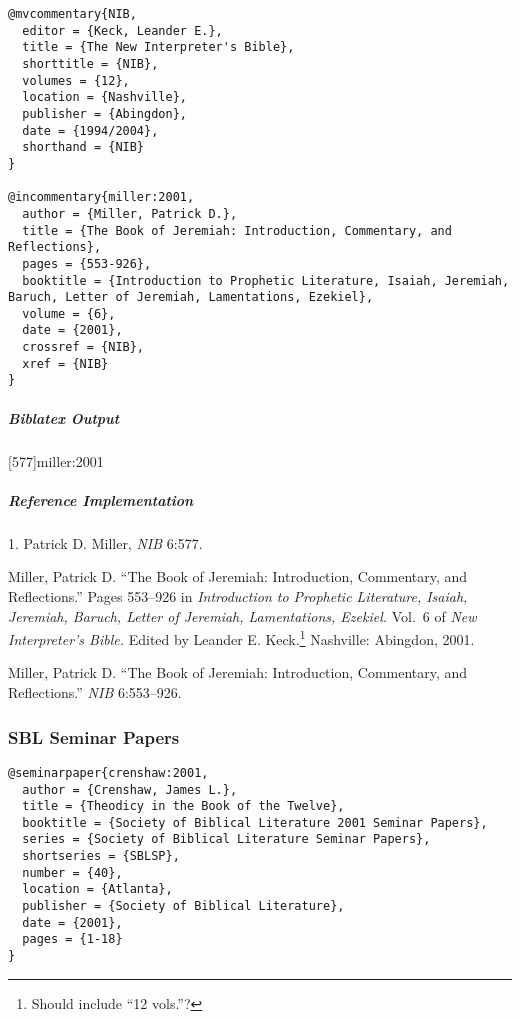\documentclass[a4paper]{article}
\newenvironment{biboutput}{%
  \subparagraph{Biblatex Output}
}{\color{black}}
\newenvironment{refimp}{%
  \subparagraph{Reference Implementation}
  \color{reference-colour}
  \rm
}{\par\color{black}}
\begin{document}
\begin{lstlisting}
@mvcommentary{NIB,
  editor = {Keck, Leander E.},
  title = {The New Interpreter's Bible},
  shorttitle = {NIB},
  volumes = {12},
  location = {Nashville},
  publisher = {Abingdon},
  date = {1994/2004},
  shorthand = {NIB}
}

@incommentary{miller:2001,
  author = {Miller, Patrick D.},
  title = {The Book of Jeremiah: Introduction, Commentary, and Reflections},
  pages = {553-926},
  booktitle = {Introduction to Prophetic Literature, Isaiah, Jeremiah, Baruch, Letter of Jeremiah, Lamentations, Ezekiel},
  volume = {6},
  date = {2001},
  crossref = {NIB},
  xref = {NIB}
}
\end{lstlisting}

\begin{biboutput}
  [577]{miller:2001}
  \toggletrue{fullbibrefs}
  \togglefalse{fullbibrefs}
\end{biboutput}

\begin{refimp}
  \hspace*{\bibindent}1. Patrick D. Miller, \emph{NIB} 6:577.

  \hangindent\bibindent Miller, Patrick D. “The Book of Jeremiah:
  Introduction, Commentary, and Reflections.” Pages 553–926 in
  \emph{Introduction to Prophetic Literature, Isaiah, Jeremiah, Baruch, Letter
  of Jeremiah, Lamentations, Ezekiel.} Vol.~6 of \emph{New Interpreter’s
  Bible.} Edited by Leander E. Keck.\footnote{Should include “12 vols.”?}
  Nashville: Abingdon, 2001.

  \hangindent\bibindent Miller, Patrick D. “The Book of Jeremiah:
  Introduction, Commentary, and Reflections.” \emph{NIB} 6:553–926.

\end{refimp}

\subsubsection{SBL Seminar Papers}

\begin{lstlisting}
@seminarpaper{crenshaw:2001,
  author = {Crenshaw, James L.},
  title = {Theodicy in the Book of the Twelve},
  booktitle = {Society of Biblical Literature 2001 Seminar Papers},
  series = {Society of Biblical Literature Seminar Papers},
  shortseries = {SBLSP},
  number = {40},
  location = {Atlanta},
  publisher = {Society of Biblical Literature},
  date = {2001},
  pages = {1-18}
}
\end{lstlisting}
\end{document}
